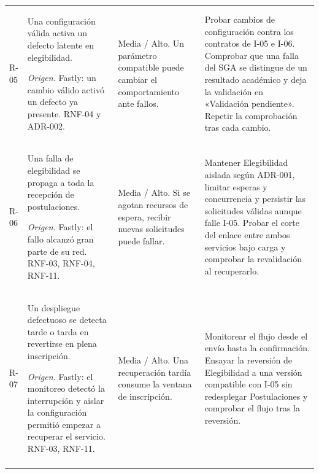 \begin{longtable}{@{}>{\raggedright\arraybackslash}p{.09\linewidth}>{\raggedright\arraybackslash}p{.29\linewidth}>{\raggedright\arraybackslash}p{.21\linewidth}>{\raggedright\arraybackslash}p{.28\linewidth}@{}}
R-05 & Una configuración válida activa un defecto latente en elegibilidad. \par\textit{Origen.} Fastly: un cambio válido activó un defecto ya presente. RNF-04 y ADR-002. & Media / Alto. Un parámetro compatible puede cambiar el comportamiento ante fallos. & Probar cambios de configuración contra los contratos de I-05 e I-06. Comprobar que una falla del SGA se distingue de un resultado académico y deja la validación en «Validación pendiente». Repetir la comprobación tras cada cambio. \\ \addlinespace
R-06 & Una falla de elegibilidad se propaga a toda la recepción de postulaciones. \par\textit{Origen.} Fastly: el fallo alcanzó gran parte de su red. RNF-03, RNF-04, RNF-11. & Media / Alto. Si se agotan recursos de espera, recibir nuevas solicitudes puede fallar. & Mantener Elegibilidad aislada según ADR-001, limitar esperas y concurrencia y persistir las solicitudes válidas aunque falle I-05. Probar el corte del enlace entre ambos servicios bajo carga y comprobar la revalidación al recuperarlo. \\ \addlinespace
R-07 & Un despliegue defectuoso se detecta tarde o tarda en revertirse en plena inscripción. \par\textit{Origen.} Fastly: el monitoreo detectó la interrupción y aislar la configuración permitió empezar a recuperar el servicio. RNF-03, RNF-11. & Media / Alto. Una recuperación tardía consume la ventana de inscripción. & Monitorear el flujo desde el envío hasta la confirmación. Ensayar la reversión de Elegibilidad a una versión compatible con I-05 sin redesplegar Postulaciones y comprobar el flujo tras la reversión. \\ \addlinespace
\end{longtable}
\endgroup
